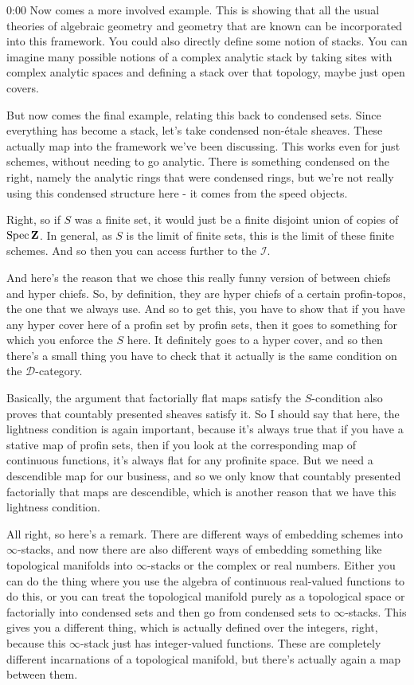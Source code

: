 \begin{unfinished}{0:00}
Now comes a more involved example. This is showing that all the usual theories of algebraic geometry and geometry that are known can be incorporated into this framework. You could also directly define some notion of stacks. You can imagine many possible notions of a complex analytic stack by taking sites with complex analytic spaces and defining a stack over that topology, maybe just open covers.

But now comes the final example, relating this back to condensed sets. Since everything has become a stack, let's take condensed non-étale sheaves. These actually map into the framework we've been discussing. This works even for just schemes, without needing to go analytic. There is something condensed on the right, namely the analytic rings that were condensed rings, but we're not really using this condensed structure here - it comes from the speed objects.

Right, so if $S$ was a finite set, it would just be a finite disjoint union of copies of $\operatorname{Spec} \mathbf Z$. In general, as $S$ is the limit of finite sets, this is the limit of these finite schemes. And so then you can access further to the $\mathcal{I}$. 

And here's the reason that we chose this really funny version of between chiefs and hyper chiefs. So, by definition, they are hyper chiefs of a certain profin-topos, the one that we always use. And so to get this, you have to show that if you have any hyper cover here of a profin set by profin sets, then it goes to something for which you enforce the $S$ here. It definitely goes to a hyper cover, and so then there's a small thing you have to check that it actually is the same condition on the $\mathcal{D}$-category.

Basically, the argument that factorially flat maps satisfy the $S$-condition also proves that countably presented sheaves satisfy it. So I should say that here, the lightness condition is again important, because it's always true that if you have a stative map of profin sets, then if you look at the corresponding map of continuous functions, it's always flat for any profinite space. But we need a descendible map for our business, and so we only know that countably presented factorially that maps are descendible, which is another reason that we have this lightness condition.

All right, so here's a remark. There are different ways of embedding schemes into $\infty$-stacks, and now there are also different ways of embedding something like topological manifolds into $\infty$-stacks or the complex or real numbers. Either you can do the thing where you use the algebra of continuous real-valued functions to do this, or you can treat the topological manifold purely as a topological space or factorially into condensed sets and then go from condensed sets to $\infty$-stacks. This gives you a different thing, which is actually defined over the integers, right, because this $\infty$-stack just has integer-valued functions. These are completely different incarnations of a topological manifold, but there's actually again a map between them.


\end{unfinished}

